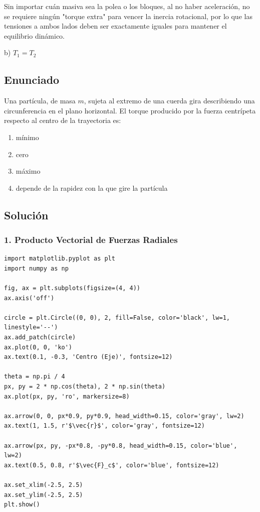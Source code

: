 \documentclass[12pt, a4paper]{article}
\begin{document}
Sin importar cuán masiva sea la polea o los bloques, al no haber aceleración, no se requiere ningún "torque extra" para vencer la inercia rotacional, por lo que las tensiones a ambos lados deben ser exactamente iguales para mantener el equilibrio dinámico.

\begin{tcolorbox}[colback=green!5!white, colframe=green!50!black, title=Respuesta Final]
\centering \Large b) $T_1 = T_2$
\end{tcolorbox}

\newpage

\subsection*{Enunciado}
Una partícula, de masa $m$, sujeta al extremo de una cuerda gira describiendo una circunferencia en el plano horizontal. El torque producido por la fuerza centrípeta respecto al centro de la trayectoria es:
\begin{enumerate}[label=\alph*)]
    \item mínimo
    \item cero
    \item máximo
    \item depende de la rapidez con la que gire la partícula
\end{enumerate}

\subsection*{Solución}

\subsubsection*{1. Producto Vectorial de Fuerzas Radiales}

\begin{verbatim}
import matplotlib.pyplot as plt
import numpy as np

fig, ax = plt.subplots(figsize=(4, 4))
ax.axis('off')

circle = plt.Circle((0, 0), 2, fill=False, color='black', lw=1, linestyle='--')
ax.add_patch(circle)
ax.plot(0, 0, 'ko')
ax.text(0.1, -0.3, 'Centro (Eje)', fontsize=12)

theta = np.pi / 4
px, py = 2 * np.cos(theta), 2 * np.sin(theta)
ax.plot(px, py, 'ro', markersize=8)

ax.arrow(0, 0, px*0.9, py*0.9, head_width=0.15, color='gray', lw=2)
ax.text(1, 1.5, r'$\vec{r}$', color='gray', fontsize=12)

ax.arrow(px, py, -px*0.8, -py*0.8, head_width=0.15, color='blue', lw=2)
ax.text(0.5, 0.8, r'$\vec{F}_c$', color='blue', fontsize=12)

ax.set_xlim(-2.5, 2.5)
ax.set_ylim(-2.5, 2.5)
plt.show()
\end{verbatim}
\end{document}
